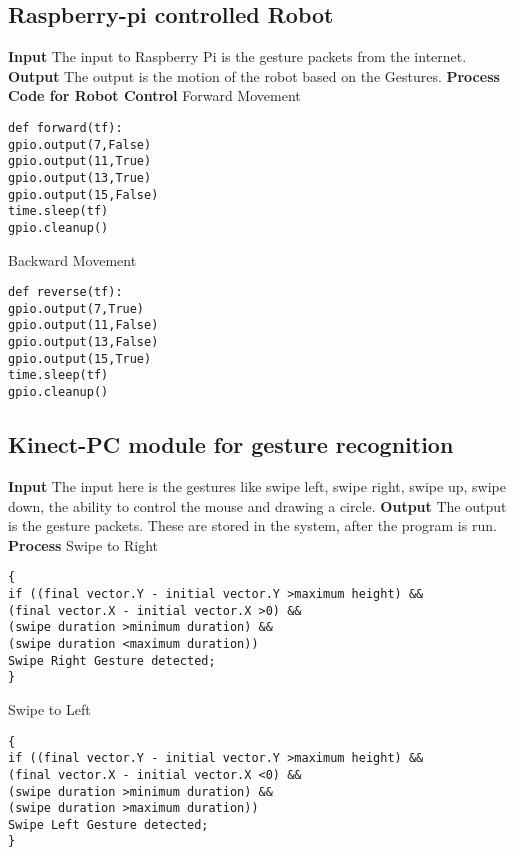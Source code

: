\subsection{Raspberry-pi controlled Robot}
\textbf{Input}\newline
The input to Raspberry Pi is the gesture packets from the internet.\newline
\textbf{Output}\newline
The output is the motion of the robot based on the Gestures.\newline
\textbf{Process}\newline
\textbf{Code for Robot Control}\newline
Forward Movement \newline
\begin{lstlisting}
def forward(tf): 
gpio.output(7,False)
gpio.output(11,True) 
gpio.output(13,True) 
gpio.output(15,False) 
time.sleep(tf)
gpio.cleanup()
\end{lstlisting} 
Backward Movement \newline
\begin{lstlisting}
def reverse(tf):
gpio.output(7,True)
gpio.output(11,False)
gpio.output(13,False)
gpio.output(15,True) 
time.sleep(tf) 
gpio.cleanup()

\end{lstlisting}


\subsection{Kinect-PC module for gesture recognition}
\textbf{Input}\newline
The input here is the gestures like swipe left, swipe right, swipe up, swipe down, the ability to control the mouse and drawing a circle. \newline
\textbf{Output}\newline
The output is the gesture packets. These are stored in the system, after the program is run.\newline
\textbf{Process}\newline
Swipe to Right
\begin{lstlisting}
{
if ((final vector.Y - initial vector.Y >maximum height) &&
(final vector.X - initial vector.X >0) &&
(swipe duration >minimum duration) &&
(swipe duration <maximum duration))
Swipe Right Gesture detected;
}
\end{lstlisting}
Swipe to Left
\begin{lstlisting}
{
if ((final vector.Y - initial vector.Y >maximum height) &&
(final vector.X - initial vector.X <0) &&
(swipe duration >minimum duration) &&
(swipe duration >maximum duration))
Swipe Left Gesture detected;
}
\end{lstlisting}
